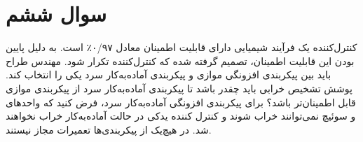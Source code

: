 \section{سوال ششم}

کنترل‌کننده یک فرآیند شیمیایی دارای قابلیت اطمینان معادل ۰/۹۷٪ است. به دلیل پایین بودن این قابلیت اطمینان، تصمیم گرفته شده که کنترل‌کننده تکرار شود. مهندس طراح باید بین پیکربندی افزونگی موازی و پیکربندی آماده‌به‌کار سرد یکی را انتخاب کند. پوشش تشخیص خرابی  باید چقدر باشد تا پیکربندی آماده‌به‌کار سرد از پیکربندی موازی قابل اطمینان‌تر باشد؟ برای پیکربندی افزونگی آماده‌به‌کار سرد، فرض کنید که واحدهای  و سوئیچ نمی‌توانند خراب شوند و کنترل کننده یدکی در حالت آماده‌به‌کار خراب نخواهند شد. در هیچ‌یک از پیکربندی‌ها تعمیرات مجاز نیستند.





